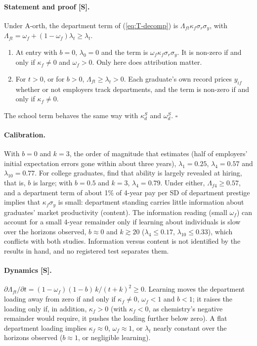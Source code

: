 \paragraph{Statement and proof [S].} Under A-orth, the department term of (\ref{eq:T-decomp}) is
$\Lambda_{ft}\kappa_f\sigma_r\sigma_y$, with $\Lambda_{ft}=\omega_f+(1-\omega_f)\lambda_t\ge\lambda_t$.
\begin{enumerate}
\item[(i)] At entry with $b=0$, $\lambda_0=0$ and the term is $\omega_f\kappa_f\sigma_r\sigma_y$. It is non-zero if
and only if $\kappa_f\neq0$ and $\omega_f>0$. Only here does attribution matter.
\item[(ii)] For $t>0$, or for $b>0$, $\Lambda_{ft}\ge\lambda_t>0$. Each graduate's own record prices $y_{if}$
whether or not employers track departments, and the term is non-zero if and only if $\kappa_f\neq0$.
\end{enumerate}
The school term behaves the same way with $\kappa^S_d$ and $\omega^S_d$. $\square$

\paragraph{Calibration.} With $b=0$ and $k=3$, the order of magnitude that \citet{lange2007speed} estimates (half
of employers' initial expectation errors gone within about three years), $\lambda_1=0.25$, $\lambda_4=0.57$ and
$\lambda_{10}=0.77$. For college graduates, \citet{arcidiacono2010beyond} find that ability is largely revealed at
hiring, that is, $b$ is large; with $b=0.5$ and $k=3$, $\lambda_4=0.79$. Under either, $\Lambda_{f4}\ge0.57$, and
a department term of about 1\% of 4-year pay per SD of department prestige implies that $\kappa_f\sigma_y$ is
small: department standing carries little information about graduates' market productivity (content). The
information reading (small $\omega_f$) can account for a small 4-year remainder only if learning about individuals
is slow over the horizons observed, $b\approx0$ and $k\gtrsim20$ ($\lambda_4\le0.17$, $\lambda_{10}\le0.33$), which
conflicts with both studies. Information versus content is not identified by the results in hand, and no
registered test separates them.

\paragraph{Dynamics [S].} $\partial\Lambda_{ft}/\partial t=(1-\omega_f)(1-b)\,k/(t+k)^2\ge0$. Learning moves the
department loading away from zero if and only if $\kappa_f\neq0$, $\omega_f<1$ and $b<1$; it raises the loading
only if, in addition, $\kappa_f>0$ (with $\kappa_f<0$, as chemistry's negative remainder would require, it pushes
the loading further below zero). A flat department loading implies $\kappa_f\approx0$, $\omega_f\approx1$, or
$\lambda_t$ nearly constant over the horizons observed ($b\approx1$, or negligible learning).

